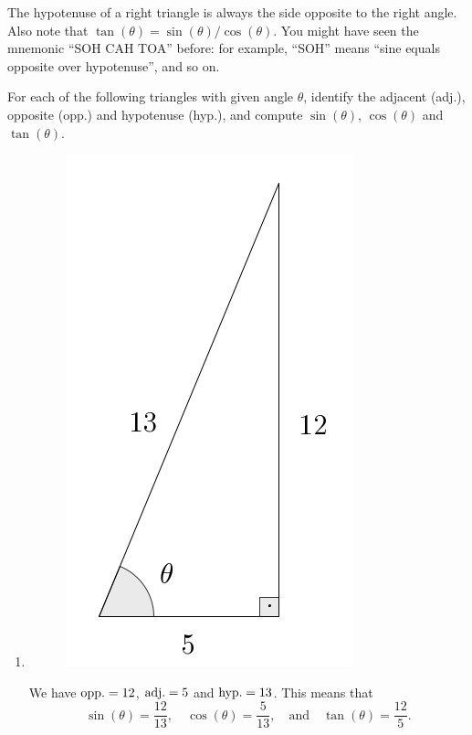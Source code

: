 \documentclass{ximera}
\begin{document}
\begin{remark}
  The hypotenuse of a right triangle is always the side opposite to the right angle. Also note that $\tan(\theta) = \sin(\theta)/\cos(\theta)$. You might have seen the mnemonic ``SOH CAH TOA'' before: for example, ``SOH'' means ``sine equals opposite over hypotenuse'', and so on.
\end{remark}

\begin{example}
  For each of the following triangles with given angle $\theta$, identify the adjacent (adj.), opposite (opp.) and hypotenuse (hyp.), and compute $\sin(\theta)$, $\cos(\theta)$ and $\tan(\theta)$.

  \begin{enumerate}[label=\alph*.]
  \item  \begin{figure}[h]
  \centering
  \includegraphics[scale=.3]{./figures/9-1-1-triangle-5-12-13.png}
\end{figure}


    \begin{explanation}
      We have ${\rm opp.} = 12$, ${\rm adj.} = 5$ and ${\rm hyp.} = 13$. This means that $$\sin(\theta) = \frac{12}{13}, \quad \cos(\theta) = \frac{5}{13},\quad \mbox{and}\quad \tan(\theta) = \frac{12}{5}.$$
    \end{explanation}
    

\end{enumerate}
\end{example}
\end{document}
